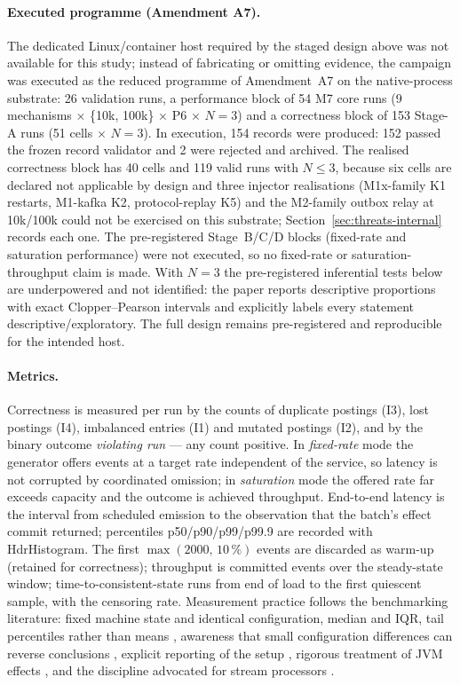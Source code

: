 \paragraph{Executed programme (Amendment A7).}
The dedicated Linux/container host required by the staged design above was not available for this
study; instead of fabricating or omitting evidence, the campaign was executed as the reduced
programme of Amendment~A7 on the native-process substrate: 26 validation runs, a performance block
of 54 M7 core runs (9 mechanisms $\times$ \{10k, 100k\} $\times$ P6 $\times$ $N=3$) and a
correctness block of 153 Stage-A runs (51 cells $\times$ $N=3$). In execution, 154 records were
produced: 152 passed the frozen record validator and 2 were rejected and archived. The realised
correctness block has 40 cells and 119 valid runs with $N\le3$, because six cells are declared not
applicable by design and three injector realisations (M1x-family K1 restarts, M1-kafka K2,
protocol-replay K5) and the M2-family outbox relay at 10k/100k could not be exercised on this
substrate; Section~\ref{sec:threats-internal} records each one. The pre-registered Stage~B/C/D
blocks (fixed-rate and saturation performance) were not executed, so no fixed-rate or
saturation-throughput claim is made. With $N=3$ the pre-registered inferential tests below are
underpowered and not identified: the paper reports descriptive proportions with exact
Clopper--Pearson intervals and explicitly labels every statement descriptive/exploratory. The full
design remains pre-registered and reproducible for the intended host.

\paragraph{Metrics.}
Correctness is measured per run by the counts of duplicate postings (I3), lost postings (I4),
imbalanced entries (I1) and mutated postings (I2), and by the binary outcome \emph{violating run}
--- any count positive. In \emph{fixed-rate} mode the generator offers events at a target rate independent of the
service, so latency is not corrupted by coordinated omission; in \emph{saturation} mode the
offered rate far exceeds capacity and the outcome is achieved throughput. End-to-end latency is
the interval from scheduled emission to the observation that the batch's effect commit returned;
percentiles p50/p90/p99/p99.9 are recorded with HdrHistogram. The first
$\max(2000,\,10\,\%)$ events are discarded as warm-up (retained for correctness); throughput is
committed events over the steady-state window; time-to-consistent-state runs from end of load to
the first quiescent sample, with the censoring rate. Measurement practice follows the benchmarking literature: fixed machine state and identical
configuration, median and IQR, tail percentiles rather than means \cite{dean2013}, awareness that
small configuration differences can reverse conclusions \cite{mytkowicz2009,raasveldt2018},
explicit reporting of the setup \cite{hoefler2015}, rigorous treatment of JVM effects
\cite{georges2007}, and the discipline advocated for stream processors \cite{theodolite2021}.

